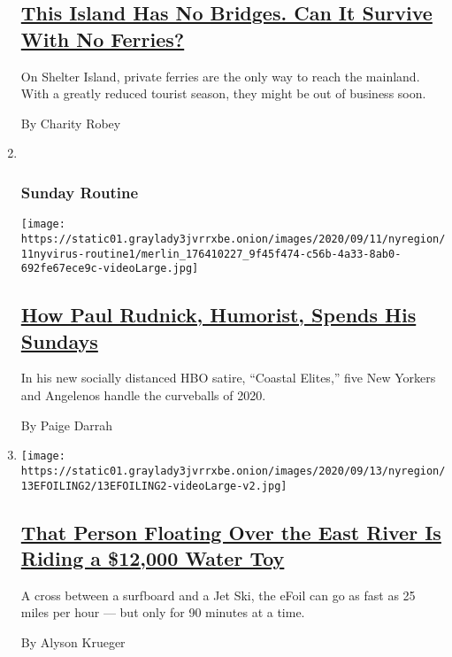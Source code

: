\begin{enumerate}
  \hypertarget{this-island-has-no-bridges-can-it-survive-with-no-ferries}{%
  \subsection{\texorpdfstring{\href{/2020/09/11/nyregion/shelter-island-ferries.html}{This
  Island Has No Bridges. Can It Survive With No
  Ferries?}}{This Island Has No Bridges. Can It Survive With No Ferries?}}\label{this-island-has-no-bridges-can-it-survive-with-no-ferries}}

  On Shelter Island, private ferries are the only way to reach the
  mainland. With a greatly reduced tourist season, they might be out of
  business soon.

  By Charity Robey
\item ~
  \hypertarget{sunday-routine}{%
  \subsubsection{Sunday Routine}\label{sunday-routine}}

  \texttt{[image: https://static01.graylady3jvrrxbe.onion/images/2020/09/11/nyregion/11nyvirus-routine1/merlin\_176410227\_9f45f474-c56b-4a33-8ab0-692fe67ece9c-videoLarge.jpg]}

  \hypertarget{how-paul-rudnick-humorist-spends-his-sundays}{%
  \subsection{\texorpdfstring{\href{/2020/09/11/nyregion/coronavirus-paul-rudnick-coastal-elites.html}{How
  Paul Rudnick, Humorist, Spends His
  Sundays}}{How Paul Rudnick, Humorist, Spends His Sundays}}\label{how-paul-rudnick-humorist-spends-his-sundays}}

  In his new socially distanced HBO satire, ``Coastal Elites,'' five New
  Yorkers and Angelenos handle the curveballs of 2020.

  By Paige Darrah
\item
  \texttt{[image: https://static01.graylady3jvrrxbe.onion/images/2020/09/13/nyregion/13EFOILING2/13EFOILING2-videoLarge-v2.jpg]}

  \hypertarget{that-person-floating-over-the-east-river-is-riding-a-12000-water-toy}{%
  \subsection{\texorpdfstring{\href{/2020/09/10/nyregion/efoil-surfing-new-york.html}{That
  Person Floating Over the East River Is Riding a \$12,000 Water
  Toy}}{That Person Floating Over the East River Is Riding a \$12,000 Water Toy}}\label{that-person-floating-over-the-east-river-is-riding-a-12000-water-toy}}

  A cross between a surfboard and a Jet Ski, the eFoil can go as fast as
  25 miles per hour --- but only for 90 minutes at a time.

  By Alyson Krueger
\end{enumerate}

